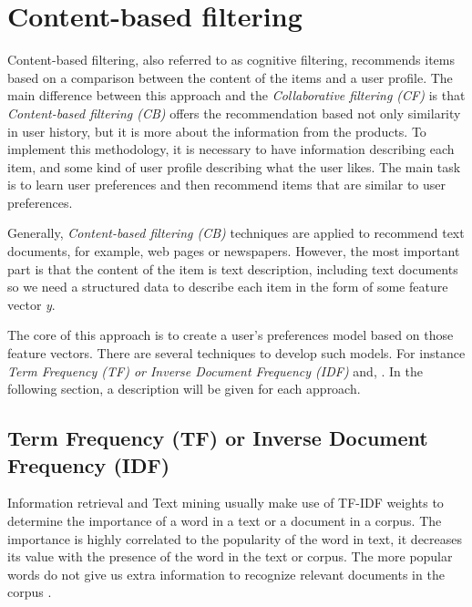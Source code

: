 \documentclass[conference]{IEEEtran}
\begin{document}
\section{Content-based filtering}


Content-based filtering, also referred to as cognitive filtering, recommends items based on a comparison between the content of the items and a user profile. The main difference between this approach and
the \textit{Collaborative filtering (CF)} is that \textit{Content-based filtering (CB)} offers the recommendation based not only similarity in user history, but it is more about the information from the products. To implement this methodology, it is necessary to have information describing each item, and some kind of user profile describing what the user likes. The main task is to learn user preferences and then recommend items that are similar to user preferences.

Generally, \textit{Content-based filtering (CB)} techniques are applied to recommend text documents, for example, web pages or newspapers. However, the most important part is that the content of the item is text description, including text documents so we need a structured data to describe each item in the form of some feature vector \textit{y}.

The core of this approach is to create a user's preferences model based on those feature vectors. There are several techniques to develop such models. For instance \textit{Term Frequency (TF) or Inverse Document Frequency (IDF)} and, . In the following section, a description will be given for each approach.

\subsection{Term Frequency (TF) or Inverse Document Frequency (IDF)}\label{AA}

Information retrieval and Text mining usually make use of TF-IDF weights to determine the importance of a word in a text or a document in a corpus. The importance is highly correlated to the popularity of the word in text, it decreases its value with the presence of the word in the text or corpus. The more popular words do not give us extra information to recognize relevant documents in the corpus \cite{b13}.
\end{document}

